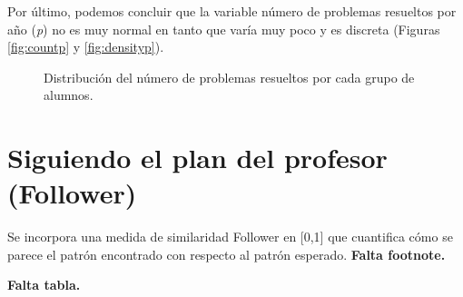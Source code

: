 Por último, podemos concluir que la variable número de problemas resueltos por año (\emph{p}) no es muy normal en tanto que varía muy poco y es discreta (Figuras \ref{fig:countp} y \ref{fig:densityp}).

\begin{figure}[H]
\centering
{}\qquad
{}
\caption{Distribución del número de problemas resueltos por cada grupo de alumnos.}
\label{fig:normalityp}
\end{figure}

\section{Siguiendo el plan del profesor (Follower)}

Se incorpora una medida de similaridad Follower en [0,1] que cuantifica cómo se parece el patrón encontrado con respecto al patrón esperado. \textbf{Falta footnote.}

\textbf{Falta tabla.}